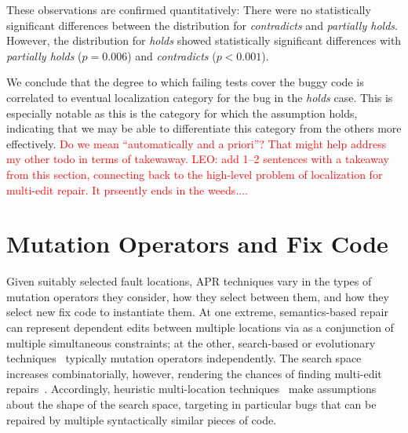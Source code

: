 \documentclass[10pt, conference]{IEEEtran}
\newcommand\todo[1]{\textcolor{red}{#1}}
\begin{document}
These observations are confirmed quantitatively: There were no statistically significant 
differences between the distribution for \emph{contradicts} and \emph{partially holds}. 
However, the distribution for \emph{holds} showed statistically significant differences with 
\emph{partially holds} ($p = 0.006$)  and \emph{contradicts} ($p < 0.001$).

We conclude that the degree to which failing tests cover the buggy 
code is correlated to eventual localization category for the bug in the \emph{holds} case. 
This is especially notable as this is the category for which the assumption holds, indicating that 
we may be able to differentiate this category from the others more effectively.
\todo{Do we mean ``automatically and a priori''? That might help address my
  other todo in terms of takewaway.}
\todo{LEO: add 1--2 sentences with a takeaway from this section,
  connecting back to the high-level problem of localization for multi-edit
   repair.  It prseently ends in the weeds....}
 
\section{Mutation Operators and Fix Code}
\label{sec:mutops}

Given suitably selected fault locations, APR techniques vary in the types of
mutation operators they consider, how they select between them, and how they
select new fix code to instantiate them. 
%
At one extreme, semantics-based repair~\cite{s3,angelix} can represent dependent edits between multiple
locations via as a conjunction of multiple simultaneous constraints; at the other, 
search-based or
evolutionary techniques~\cite{genprog,par} typically mutation
operators independently. 
The search space increases combinatorially, however, rendering
the chances of finding multi-edit repairs~\cite{ae,long-search-spaces}. Accordingly, heuristic multi-location
techniques~\cite{saha2019harnessing} make assumptions about the 
shape of the search space, 
targeting in particular bugs that can be repaired by multiple syntactically similar pieces of
code.
\end{document}
